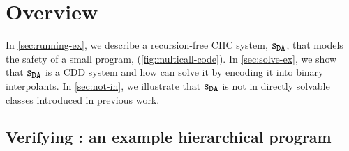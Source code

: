 \section{Overview}
\label{sec:overview}

In \autoref{sec:running-ex}, we describe a recursion-free CHC system,
$\mcchc$, that models the safety of a small program,
 (\autoref{fig:multicall-code}).
%
In \autoref{sec:solve-ex}, we show that $\mcchc$ is a CDD system and
how \sys can solve it by encoding it into binary interpolants.
%
In \autoref{sec:not-in}, we illustrate that $\mcchc$ is not in
directly solvable classes introduced in previous work.
%

\subsection{Verifying : an example hierarchical program}
\label{sec:running-ex}

